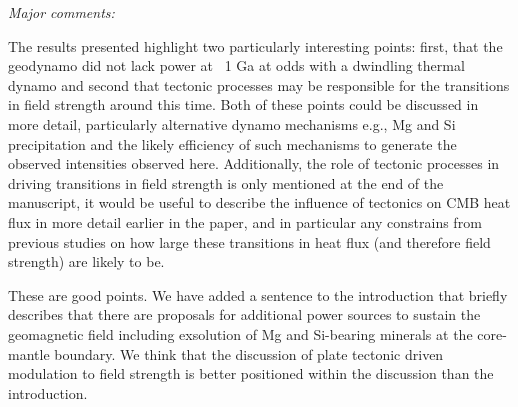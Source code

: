 \documentclass[11pt, letterpaper]{article}
\begin{document}
\begin{flushleft}
\itshape
Major comments:

The results presented highlight two particularly interesting points: first, that the geodynamo did not lack power at ~1 Ga at odds with a dwindling thermal dynamo and second that tectonic processes may be responsible for the transitions in field strength around this time. Both of these points could be discussed in more detail, particularly alternative dynamo mechanisms e.g., Mg and Si precipitation and the likely efficiency of such mechanisms to generate the observed intensities observed here. Additionally, the role of tectonic processes in driving transitions in field strength is only mentioned at the end of the manuscript, it would be useful to describe the influence of tectonics on CMB heat flux in more detail earlier in the paper, and in particular any constrains from previous studies on how large these transitions in heat flux (and therefore field strength) are likely to be.
\upshape

These are good points. We have added a sentence to the introduction that briefly describes that there are proposals for additional power sources to sustain the geomagnetic field including exsolution of Mg and Si-bearing minerals at the core-mantle boundary. We think that the discussion of plate tectonic driven modulation to field strength is better positioned within the discussion than the introduction. 



\end{flushleft}
\end{document}
